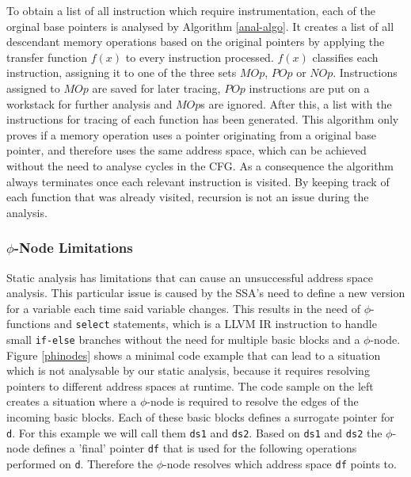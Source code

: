 To obtain a list of all instruction which require instrumentation, each of the orginal base pointers is analysed by Algorithm \ref{anal-algo}. It creates a list of all descendant memory operations based on the original  pointers by applying the transfer function $f(x)$ to every instruction processed. $f(x)$ classifies each instruction, assigning it to one of the three sets $MOp$, $POp$ or $NOp$. Instructions assigned to $MOp$ are saved for later tracing, $POp$ instructions are put on a workstack for further analysis and $MOp$s are ignored. After this, a list with the instructions for tracing of each function has been generated. This algorithm only proves if a memory operation uses a pointer originating from a original base pointer, and therefore uses the same address space, which can be achieved without the need to analyse cycles in the CFG. As a consequence the algorithm always terminates once each relevant instruction is visited. By keeping track of each function that was already visited, recursion is not an issue during the analysis.



\subsubsection{$\phi$-Node Limitations}\label{patho}
Static analysis has limitations that can cause an unsuccessful address space analysis. This particular issue is caused by the SSA's need to define a new version for a variable each time said variable changes. This results in the need of $\phi$-functions and \verb|select| statements, which is a LLVM IR instruction to handle small \verb|if-else| branches without the need for multiple basic blocks
and a $\phi$-node. Figure \ref{phinodes} shows a minimal code example that can lead to a situation which is not analysable by our static analysis, because it requires resolving pointers to different address spaces at runtime. The code sample on the left creates a situation where a $\phi$-node is required to resolve the edges of the incoming basic blocks. Each of these basic blocks defines a surrogate pointer for \verb|d|. For this example we will call them \verb|ds1| and \verb|ds2|. Based on \verb|ds1| and \verb|ds2| the $\phi$-node defines a 'final' pointer \verb|df| that is used for the following operations performed on \verb|d|. Therefore the $\phi$-node resolves which address space \verb|df| points to. 

